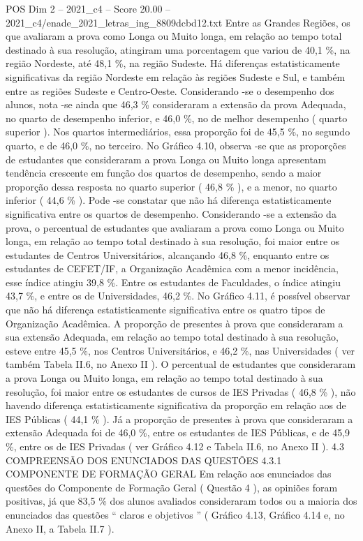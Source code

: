 \begin{textsample}{POS Dim 2 – 2021\_c4 – Score 20.00 – 2021\_c4/enade\_2021\_letras\_ing\_8809dcbd12.txt}
Entre as Grandes Regiões, os que avaliaram a prova como Longa ou Muito longa, em relação ao tempo total destinado à sua resolução, atingiram uma porcentagem que variou de 40,1 \%, na região Nordeste, até 48,1 \%, na região Sudeste.
Há diferenças estatisticamente significativas da região Nordeste em relação às regiões Sudeste e Sul, e também entre as regiões Sudeste e Centro-Oeste.
Considerando -se o desempenho dos alunos, nota -se ainda que 46,3 \% consideraram a extensão da prova Adequada, no quarto de desempenho inferior, e 46,0 \%, no de melhor desempenho ( quarto superior ).
Nos quartos intermediários, essa proporção foi de 45,5 \%, no segundo quarto, e de 46,0 \%, no terceiro.
No Gráfico 4.10, observa -se que as proporções de estudantes que consideraram a prova Longa ou Muito longa apresentam tendência crescente em função dos quartos de desempenho, sendo a maior proporção dessa resposta no quarto superior ( 46,8 \% ), e a menor, no quarto inferior ( 44,6 \% ).
Pode -se constatar que não há diferença estatisticamente significativa entre os quartos de desempenho.
Considerando -se a extensão da prova, o percentual de estudantes que avaliaram a prova como Longa ou Muito longa, em relação ao tempo total destinado à sua resolução, foi maior entre os estudantes de Centros Universitários, alcançando 46,8 \%, enquanto entre os estudantes de CEFET/IF, a Organização Acadêmica com a menor incidência, esse índice atingiu 39,8 \%.
Entre os estudantes de Faculdades, o índice atingiu 43,7 \%, e entre os de Universidades, 46,2 \%.
No Gráfico 4.11, é possível observar que não há diferença estatisticamente significativa entre os quatro tipos de Organização Acadêmica.
A proporção de presentes à prova que consideraram a sua extensão Adequada, em relação ao tempo total destinado à sua resolução, esteve entre 45,5 \%, nos Centros Universitários, e 46,2 \%, nas Universidades ( ver também Tabela II.6, no Anexo II ).
O percentual de estudantes que consideraram a prova Longa ou Muito longa, em relação ao tempo total destinado à sua resolução, foi maior entre os estudantes de cursos de IES Privadas ( 46,8 \% ), não havendo diferença estatisticamente significativa da proporção em relação aos de IES Públicas ( 44,1 \% ).
Já a proporção de presentes à prova que consideraram a extensão Adequada foi de 46,0 \%, entre os estudantes de IES Públicas, e de 45,9 \%, entre os de IES Privadas ( ver Gráfico 4.12 e Tabela II.6, no Anexo II ). 4.3 COMPREENSÃO DOS ENUNCIADOS DAS QUESTÕES 4.3.1 COMPONENTE DE FORMAÇÃO GERAL Em relação aos enunciados das questões do Componente de Formação Geral ( Questão 4 ), as opiniões foram positivas, já que 83,5 \% dos alunos avaliados consideraram todos ou a maioria dos enunciados das questões “ claros e objetivos ” ( Gráfico 4.13, Gráfico 4.14 e, no Anexo II, a Tabela II.7 ).

\end{textsample}
